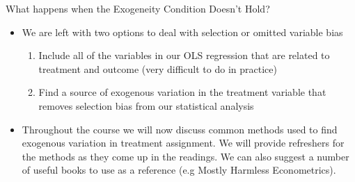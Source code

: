 \documentclass{beamer}
\begin{document}
\begin{frame}{What happens when the Exogeneity Condition Doesn't Hold?}
	\begin{itemize}
		\item We are left with two options to deal with selection or omitted variable bias
		\begin{enumerate}
			\item Include all of the variables in our OLS regression that are related to treatment and outcome (very difficult to do in practice) \medskip
			\item Find a source of exogenous variation in the treatment variable that removes selection bias from our statistical analysis
		\end{enumerate} 
	\item  Throughout the course we will now discuss common methods used to find exogenous variation in treatment assignment. We will provide refreshers for the methods as they come up in the readings. We can also suggest a number of useful books to use as a reference (e.g Mostly Harmless Econometrics). 
	
	\end{itemize}

\end{frame}
\end{document}
